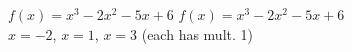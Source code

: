 {$f(x) = x^{3} - 2x^{2} - 5x + 6$}
{$f(x) = x^{3} - 2x^{2} - 5x + 6$ \\ $x = -2$, $x = 1$, $x = 3$ (each has mult. 1)}